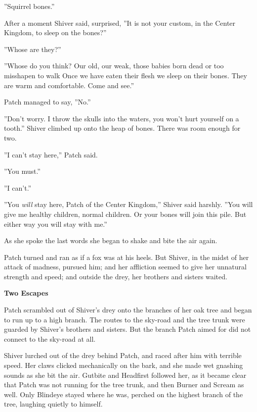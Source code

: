 \documentclass[11pt]{article}
\begin{document}
''Squirrel bones.''\par
After a moment Shiver said, surprised, ''It is not your custom, in the Center Kingdom, to sleep on the bones?''\par
''Whose are they?''\par
''Whose do you think? Our old, our weak, those babies born dead or too misshapen to walk%
Once we have eaten their flesh we sleep on their bones. They are warm and comfortable. Come and see.''\par
Patch managed to say, ''No.''\par
''Don't worry. I throw the skulls into the waters, you won't hurt yourself on a tooth.'' Shiver climbed up onto the heap of bones. There was room enough for two.\par
 ''I can't stay here,'' Patch said.\par
 ''You must.''\par
 ''I can't.''\par
 ''You {\it will} stay here, Patch of the Center Kingdom,'' Shiver said harshly. ''You will give me healthy children, normal children. Or your bones will join this pile. But either way you will stay with me.''\par
 As she spoke the last words she began to shake and bite the air again.\par
Patch turned and ran as if a fox was at his heels. But Shiver, in the midst of her attack of madness, pursued him; and her affliction seemed to give her unnatural strength and speed; and outside the drey, her brothers and sisters waited.\par
\par
{\bf Two Escapes\par
}\par
 Patch scrambled out of Shiver's drey onto the branches of her oak tree and began to run up to a high branch. The routes to the sky-road and the tree trunk were guarded by Shiver's brothers and sisters. But the branch Patch aimed for did not connect to the sky-road at all.\par
 Shiver lurched out of the drey behind Patch, and raced after him with terrible speed. Her claws clicked mechanically on the bark, and she made wet gnashing sounds as she bit the air. Gutbite and Headfirst followed her, as it became clear that Patch was not running for the tree trunk, and then Burner and Scream as well. Only Blindeye stayed where he was, perched on the highest branch of the tree, laughing quietly to himself.\par
\end{document}
